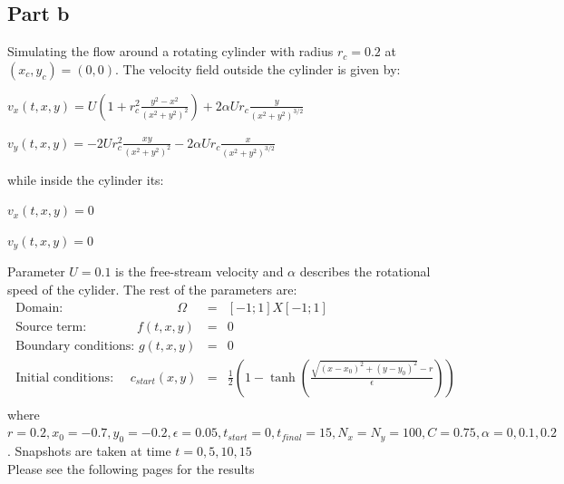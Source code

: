 \documentclass[12pt]{article}
\begin{document}
\subsection{Part b}\label{sec::b}
Simulating the flow around a rotating cylinder with radius $r_c = 0.2$ at $(x_c,y_c)=(0,0)$.  The velocity field outside the cylinder is given by:
\begin{center}
$v_x(t,x,y) = U(1+r_c^2 \frac{y^2-x^2}{(x^2+y^2)^2})+2 \alpha Ur_c \frac{y}{(x^2+y^2)^{3/2}}$
\end{center}
\begin{center}
$v_y(t,x,y) = -2Ur_c^2\frac{xy}{(x^2+y^2)^2}-2 \alpha Ur_c \frac{x}{(x^2+y^2)^{3/2}}$
\end{center}
while inside the cylinder its:
\begin{center}
$v_x(t,x,y)=0$
\end{center}
\begin{center}
$v_y(t,x,y)=0$
\end{center}
Parameter $U = 0.1$ is the free-stream velocity and $\alpha$ describes the rotational speed of the cylider.  The rest of the parameters  are:
\begin{eqnarray}
\textrm{Domain:}\quad \quad \quad \quad \quad \quad \quad \quad \quad \Omega &=& [-1;1]X[-1;1]  \\\nonumber
\textrm{Source term:}\quad \quad \quad \quad f(t,x,y)&=&0 \\\nonumber
\textrm{Boundary conditions: } g(t,x,y)&=&0 \\\nonumber
\textrm{Initial conditions: }\quad c_{start}(x,y)&=&\frac{1}{2}\left(1-\tanh \left( \frac{\sqrt{(x-x_0)^2+(y-y_0)^2}-r}{\epsilon}\right)\right)\\\nonumber 
\end{eqnarray}
where $r=0.2, x_0=-0.7, y_0=-0.2, \epsilon = 0.05, t_{start} = 0, t_{final}=15, N_x = N_y=100, C = 0.75, \alpha = 0, 0.1, 0.2$.  Snapshots are taken at time $t=0, 5, 10, 15$ \\
Please see the following pages for the results
\end{document}
